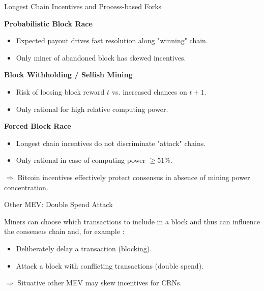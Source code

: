 \documentclass[]{beamer}
\begin{document}
\begin{frame}{Longest Chain Incentives and Process-based Forks}

\textbf{Probabilistic Block Race}
\begin{itemize}
	\item	Expected payout drives fast resolution along "winning" chain. 
	\item	Only miner of abandoned block has skewed incentives.
\end{itemize}

\vspace{0.5 em}

\textbf{Block Withholding / Selfish Mining}
\begin{itemize}
	\item	Risk of loosing block reward $t$ vs. increased chances on $t+1$.
	\item	Only rational for high relative computing power.
\end{itemize}

\vspace{0.5 em}

\textbf{Forced Block Race}
\begin{itemize}
	\item	Longest chain incentives do not discriminate "attack" chains.
	\item	Only rational in case of computing power $\ge 51\%$.
\end{itemize}

\vspace{1.0 em}

$\Rightarrow$ Bitcoin incentives effectively protect consensus in absence of mining power concentration.

\end{frame}

\begin{frame}{Other MEV: Double Spend Attack}

Miners can choose which transactions to include in a block and thus can influence the consensus chain and, for example :
\begin{itemize}
	\item	Deliberately delay a transaction (blocking).
	\item	Attack a block with conflicting transactions (double spend).
\end{itemize}

\vspace{0.5 em}
$\Rightarrow$ Situative other MEV may skew incentives for CRNs.


\end{frame}
\end{document}
